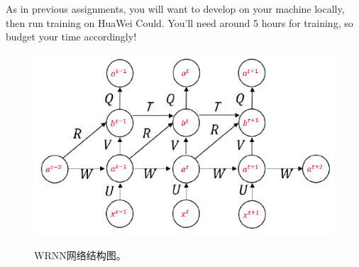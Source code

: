 \documentclass[letterpaper,12pt]{article}
\begin{document}
	As in previous assignments, you will want to develop on your machine locally, then run training on HuaWei Could. You’ll need around 5 hours for training, so budget your time accordingly!
	
	\begin{figure}[htbp] 
		\centering 
		\includegraphics[width=0.5\linewidth]{network}
		\captionsetup{font=scriptsize}
		\label{network}
		\captionsetup{font=scriptsize}
		\caption{
			\label{fig: WRNN_network} %
			WRNN网络结构图。
		}
	\end{figure}
\end{document}
